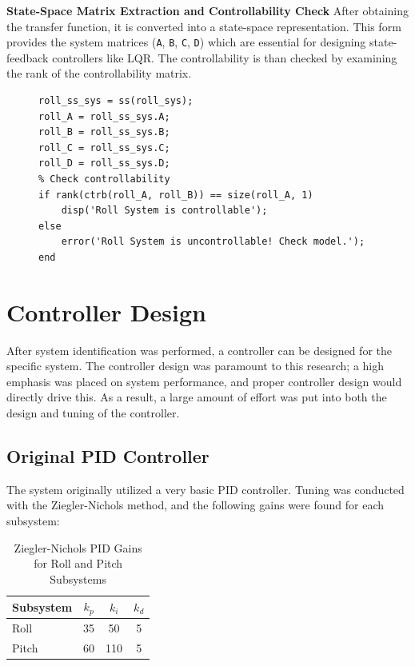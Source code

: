 \textbf{State-Space Matrix Extraction and Controllability Check}
After obtaining the transfer function, it is converted into a state-space representation. This form provides the system matrices (\texttt{A}, \texttt{B}, \texttt{C}, \texttt{D}) which are essential for designing state-feedback controllers like LQR. The controllability is than checked by examining the rank of the controllability matrix.

\begin{figure}[h!]
\centering
\begin{lstlisting}[caption={Roll State-Space Extraction and Controllability Check}, label={lst:roll_statespace_controllability}]
% Convert to state-space
roll_ss_sys = ss(roll_sys);
roll_A = roll_ss_sys.A;
roll_B = roll_ss_sys.B;
roll_C = roll_ss_sys.C;
roll_D = roll_ss_sys.D;
% Check controllability
if rank(ctrb(roll_A, roll_B)) == size(roll_A, 1)
    disp('Roll System is controllable');
else
    error('Roll System is uncontrollable! Check model.');
end
\end{lstlisting}
\end{figure}
\section{Controller Design}

After system identification was performed, a controller can be designed for the specific system. The controller design was paramount to this research; a high emphasis was placed on system performance, and proper controller design would directly drive this. As a result, a large amount of effort was put into both the design and tuning of the controller.

\subsection{Original PID Controller}

The system originally utilized a very basic PID controller. Tuning was conducted with the Ziegler-Nichols method, and the following gains were found for each subsystem:

\begin{table}[htbp]
    \centering
    \caption{Ziegler-Nichols PID Gains for Roll and Pitch Subsystems}
    \label{tab:pid_gains}
    \begin{tabular}{l c c c}
        \toprule
        \textbf{Subsystem} & \textbf{$k_p$} & \textbf{$k_i$} & \textbf{$k_d$} \\
        \midrule
        Roll               & 35             & 50             & 5              \\
        Pitch              & 60             & 110            & 5              \\
        \bottomrule
    \end{tabular}
\end{table}

